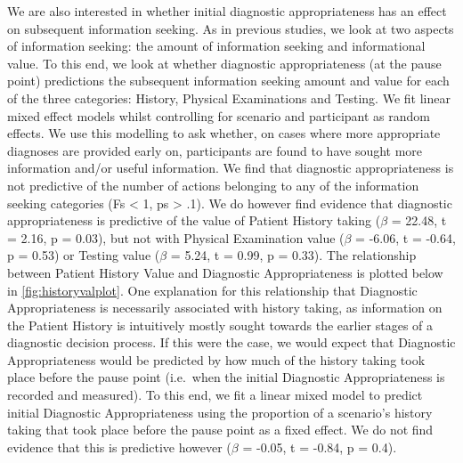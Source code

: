 \documentclass[a4paper, nobind]{templates/ociamthesis}
\begin{document}
\hfill\break
We are also interested in whether initial diagnostic appropriateness has an effect on subsequent information seeking. As in previous studies, we look at two aspects of information seeking: the amount of information seeking and informational value. To this end, we look at whether diagnostic appropriateness (at the pause point) predictions the subsequent information seeking amount and value for each of the three categories: History, Physical Examinations and Testing. We fit linear mixed effect models whilst controlling for scenario and participant as random effects. We use this modelling to ask whether, on cases where more appropriate diagnoses are provided early on, participants are found to have sought more information and/or useful information. We find that diagnostic appropriateness is not predictive of the number of actions belonging to any of the information seeking categories (Fs \textless{} 1, ps \textgreater{} .1). We do however find evidence that diagnostic appropriateness is predictive of the value of Patient History taking (\(\beta\) = 22.48, t = 2.16, p = 0.03), but not with Physical Examination value (\(\beta\) = -6.06, t = -0.64, p = 0.53) or Testing value (\(\beta\) = 5.24, t = 0.99, p = 0.33). The relationship between Patient History Value and Diagnostic Appropriateness is plotted below in \hyperref[fig:historyvalplot]{\ref{fig:historyvalplot}}. One explanation for this relationship that Diagnostic Appropriateness is necessarily associated with history taking, as information on the Patient History is intuitively mostly sought towards the earlier stages of a diagnostic decision process. If this were the case, we would expect that Diagnostic Appropriateness would be predicted by how much of the history taking took place before the pause point (i.e.~when the initial Diagnostic Appropriateness is recorded and measured). To this end, we fit a linear mixed model to predict initial Diagnostic Appropriateness using the proportion of a scenario's history taking that took place before the pause point as a fixed effect. We do not find evidence that this is predictive however (\(\beta\) = -0.05, t = -0.84, p = 0.4).
\end{document}
